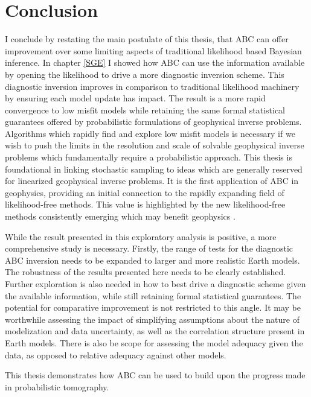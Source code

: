 

\chapter{Conclusion}

I conclude by restating the main postulate of this thesis, that ABC can offer improvement over some limiting aspects of traditional likelihood based Bayesian inference. In chapter \ref{SGE} I showed how ABC can use the information available by opening the likelihood to drive a more diagnostic inversion scheme. This diagnostic inversion improves in comparison to traditional likelihood machinery by ensuring each model update has impact. The result is a more rapid convergence to low misfit models while retaining the same formal statistical guarantees offered by probabilistic formulations of geophysical inverse problems. Algorithms which rapidly find and explore low misfit models is necessary if we wish to push the limits in the resolution and scale of solvable geophysical inverse problems which fundamentally require a probabilistic approach. This thesis is foundational in linking stochastic sampling to ideas which are generally reserved for linearized geophysical inverse problems. It is the first application of ABC in geophysics, providing an initial connection to the rapidly expanding field of likelihood-free methods. This value is highlighted by the new likelihood-free methods consistently emerging which may benefit geophysics \citep{papamakarios2016fast,song2017nice}.\par

While the result presented in this exploratory analysis is positive, a more comprehensive study is necessary. Firstly, the range of tests for the diagnostic ABC inversion needs to be expanded to larger and more realistic Earth models. The robustness of the results presented here needs to be clearly established. Further exploration is also needed in how to best drive a diagnostic scheme given the available information, while still retaining formal statistical guarantees. The potential for comparative improvement is not restricted to this angle. It may be worthwhile assessing the impact of simplifying assumptions about the nature of modelization and data uncertainty, as well as the correlation structure present in Earth models. There is also be scope for assessing the model adequacy given the data, as opposed to relative adequacy against other models. \par
This thesis demonstrates how ABC can be used to build upon the progress made in probabilistic tomography.
